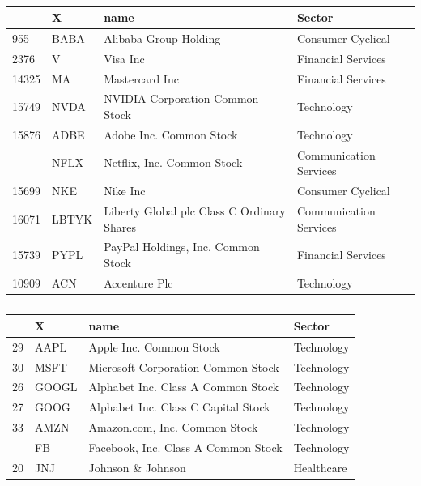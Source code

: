 \documentclass[11pt,]{article}
\begin{document}
\begin{table}[!htb]
    \begin{minipage}{.5\linewidth}
      \caption{}
      \centering 
\begin{tabular}{llll}
\toprule
  & X & name & Sector\\
\midrule
955 & BABA & Alibaba Group Holding & Consumer Cyclical\\
2376 & V & Visa Inc & Financial Services\\
14325 & MA & Mastercard Inc & Financial Services\\
15749 & NVDA & NVIDIA Corporation Common Stock & Technology\\
15876 & ADBE & Adobe Inc. Common Stock & Technology\\
\addlinespace
15802 & NFLX & Netflix, Inc. Common Stock & Communication Services\\
15699 & NKE & Nike Inc & Consumer Cyclical\\
16071 & LBTYK & Liberty Global plc Class C Ordinary Shares & Communication Services\\
15739 & PYPL & PayPal Holdings, Inc. Common Stock & Financial Services\\
10909 & ACN & Accenture Plc & Technology\\
\bottomrule
\end{tabular} \end{minipage}%
    \begin{minipage}{.5\linewidth}
      \centering
        \caption{} 
\begin{tabular}{llll}
\toprule
  & X & name & Sector\\
\midrule
29 & AAPL & Apple Inc. Common Stock & Technology\\
30 & MSFT & Microsoft Corporation Common Stock & Technology\\
26 & GOOGL & Alphabet Inc. Class A Common Stock & Technology\\
27 & GOOG & Alphabet Inc. Class C Capital Stock & Technology\\
33 & AMZN & Amazon.com, Inc. Common Stock & Technology\\
\addlinespace
24 & FB & Facebook, Inc. Class A Common Stock & Technology\\
20 & JNJ & Johnson \& Johnson & Healthcare\\
\bottomrule
\end{tabular} \end{minipage} 
\end{table}
\end{document}

